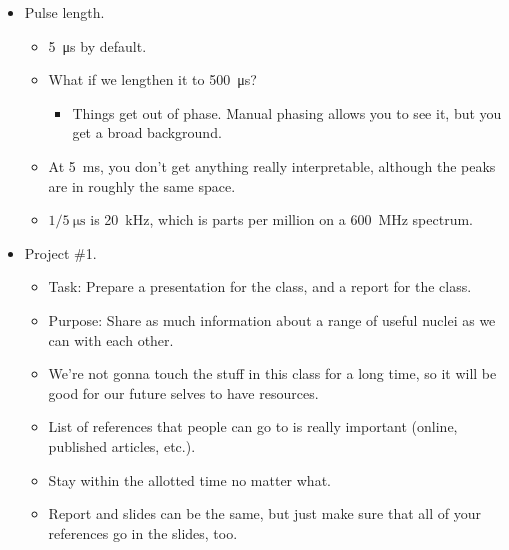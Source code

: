 \documentclass[../notes.tex]{subfiles}
\begin{document}
\begin{itemize}
    \item Pulse length.
    \begin{itemize}
        \item \SI{5}{\micro\second} by default.
        \item What if we lengthen it to \SI{500}{\micro\second}?
        \begin{itemize}
            \item Things get out of phase. Manual phasing allows you to see it, but you get a broad background.
        \end{itemize}
        \item At \SI{5}{\milli\second}, you don't get anything really interpretable, although the peaks are in roughly the same space.
        \item $1/\SI{5}{\micro\second}$ is \SI{20}{\kilo\hertz}, which is parts per million on a \SI{600}{\mega\hertz} spectrum.
    \end{itemize}
    \item Project \#1.
    \begin{itemize}
        \item Task: Prepare a presentation for the class, and a report for the class.
        \item Purpose: Share as much information about a range of useful nuclei as we can with each other.
        \item We're not gonna touch the stuff in this class for a long time, so it will be good for our future selves to have resources.
        \item List of references that people can go to is really important (online, published articles, etc.).
        \item Stay within the allotted time no matter what.
        \item Report and slides can be the same, but just make sure that all of your references go in the slides, too.
    \end{itemize}
\end{itemize}
\end{document}
